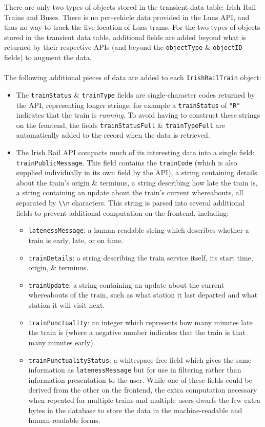 \documentclass[a4paper,11pt]{report}
\begin{document}
There are only two types of objects stored in the transient data table: Irish Rail Trains and Buses.
There is no per-vehicle data provided in the Luas API, and thus no way to track the live location of Luas trams.
For the two types of objects stored in the transient data table, additional fields are added beyond what is returned by their respective APIs (and beyond the \verb|objectType| \& \verb|objectID| fields) to augment the data.
\\\\
The following additional pieces of data are added to each \verb|IrishRailTrain| object:
\begin{itemize}
    \item   The \verb|trainStatus| \& \verb|trainType| fields are single-character codes returned by the API, representing longer strings; for example a \verb|trainStatus| of \verb|"R"| indicates that the train is \textit{running}.
            To avoid having to construct these strings on the frontend, the fields \verb|trainStatusFull| \& \verb|trainTypeFull| are automatically added to the record when the data is retrieved.

    \item   The Irish Rail API compacts much of its interesting data into a single field: \verb|trainPublicMessage|.
            This field contains the \verb|trainCode| (which is also supplied individually in its own field by the API), a string containing details about the train's origin \& terminus, a string describing how late the train is, a string containing an update about the train's current whereabouts, all separated by \verb|\\n| characters.
            This string is parsed into several additional fields to prevent additional computation on the frontend, including:
            \begin{itemize}
                \item   \verb|latenessMessage|: a human-readable string which describes whether a train is early, late, or on time.
                \item   \verb|trainDetails|: a string describing the train service itself, its start time, origin, \& terminus.
                \item   \verb|trainUpdate|: a string containing an update about the current whereabouts of the train, such as what station it last departed and what station it will visit next. 
                \item   \verb|trainPunctuality|: an integer which represents how many minutes late the train is (where a negative number indicates that the train is that many minutes early).
                \item   \verb|trainPunctualityStatus|: a whitespace-free field which gives the same information as \verb|latenessMessage| but for use in filtering rather than information presentation to the user.
                        While one of these fields could be derived from the other on the frontend, the extra computation necessary when repeated for multiple trains and multiple users dwarfs the few extra bytes in the database to store the data in the machine-readable and human-readable forms.
            \end{itemize}


\end{itemize}
\end{document}
